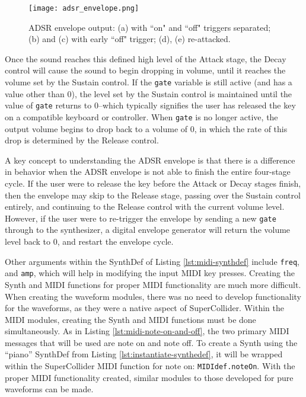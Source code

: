 \begin{figure}
  \centering
  \texttt{[image: adsr\_envelope.png]}
  \caption{ADSR envelope output: (a) with ``on" and ``off" triggers separated; (b) and (c) with early ``off" trigger; (d), (e) re-attacked.}
  \label{fig:adsr-envelope}
\end{figure}

Once the sound reaches this defined high level of the Attack stage, the Decay control will cause the sound to begin dropping in volume, until it reaches the volume set by the Sustain control. If the \texttt{gate} variable is still active (and has a value other than 0), the level set by the Sustain control is maintained until the value of \texttt{gate} returns to 0--which typically signifies the user has released the key on a compatible keyboard or controller. When \texttt{gate} is no longer active, the output volume begins to drop back to a volume of 0, in which the rate of this drop is determined by the Release control. 

A key concept to understanding the ADSR envelope is that there is a difference in behavior when the ADSR envelope is not able to finish the entire four-stage cycle. If the user were to release the key before the Attack or Decay stages finish, then the envelope may skip to the Release stage, passing over the Sustain control entirely, and continuing to the Release control with the current volume level. However, if the user were to re-trigger the envelope by sending a new \texttt{gate} through to the synthesizer, a digital envelope generator will return the volume level back to 0, and restart the envelope cycle.

Other arguments within the SynthDef of Listing \ref{lst:midi-synthdef} include \texttt{freq}, and \texttt{amp}, which will help in modifying the input MIDI key presses. Creating the Synth and MIDI functions for proper MIDI functionality are much more difficult. When creating the waveform modules, there was no need to develop functionality for the waveforms, as they were a native aspect of SuperCollider. Within the MIDI modules, creating the Synth and MIDI functions must be done simultaneously. As in Listing \ref{lst:midi-note-on-and-off}, the two primary MIDI messages that will be used are note on and note off. To create a Synth using the ``piano'' SynthDef from Listing \ref{lst:instantiate-synthedef}, it will be wrapped within the SuperCollider MIDI function for note on: \texttt{MIDIdef.noteOn}. With the proper MIDI functionality created, similar modules to those developed for pure waveforms can be made.

